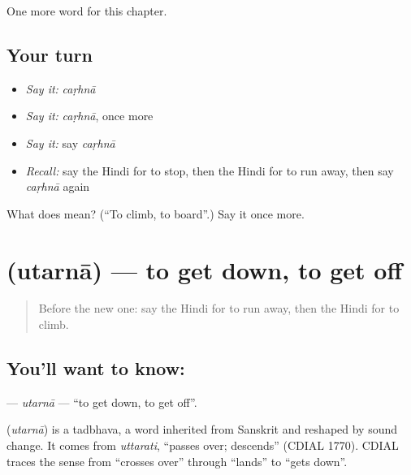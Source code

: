 \begin{grammarlens}[title={What you've built}]
One more word for this chapter.
\end{grammarlens}

\subsection*{Your turn}
\begin{itemize}
\raggedright
  \item \emph{Say it:} \emph{caṛhnā}
  \item \emph{Say it:} \emph{caṛhnā}, once more
  \item \emph{Say it:} say \emph{caṛhnā}
  \item \emph{Recall:} say the Hindi for to stop, then the Hindi for to run away, then say \emph{caṛhnā} again
\end{itemize}

\begin{tcolorbox}[breakable,colback=teal!4,colframe=teal!35!black,title={Before you move on}]
What does  mean? (\textquotedblleft{}To climb, to board\textquotedblright{}.) Say it once more.
\end{tcolorbox}
\section[\texorpdfstring{\hi{उतरना} (utarnā)}{उतरना (utarnā)}]{ (utarnā) — to get down, to get off}

\label{lesson:HI-C172-utarna}



\begin{quote}
Before the new one: say the Hindi for to run away, then the Hindi for to climb.
\end{quote}

\subsection*{You'll want to know: }
\textbf{} — \emph{utarnā} — \textquotedblleft{}to get down, to get off\textquotedblright{}.

\begin{cousinweb}
\textbf{} (\emph{utarnā}) is a tadbhava, a word inherited from Sanskrit and reshaped by sound change. It comes from \emph{uttarati}, \textquotedblleft{}passes over; descends\textquotedblright{} (CDIAL 1770). CDIAL traces the sense from \textquotedblleft{}crosses over\textquotedblright{} through \textquotedblleft{}lands\textquotedblright{} to \textquotedblleft{}gets down\textquotedblright{}.
\end{cousinweb}

